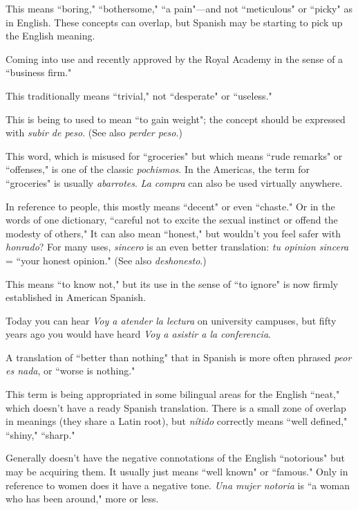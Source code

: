  This means ``boring," ``bothersome," ``a pain"---and not ``meticulous" or ``picky" as in English. These concepts can
overlap, but Spanish may be starting to pick up the English meaning.

 Coming into use and recently approved by the Royal
Academy in the sense of a ``business firm."

 This traditionally means ``trivial," not ``desperate" or
``useless."

 This is being to used to mean ``to gain
weight"; the concept should be expressed with \emph{subir de peso}. (See
also \emph{perder peso}.)

 This word, which is misused for ``groceries" but
which means ``rude remarks" or ``offenses," is one of the classic \emph{pochismos}. In the Americas, the term for ``groceries" is usually \emph{abarrotes}. \emph{La compra} can also be used virtually anywhere.

 In reference to people, this mostly means ``decent"
or even ``chaste." Or in the words of one dictionary, ``careful not to excite the sexual instinct or offend the modesty of others," It can also
mean ``honest," but wouldn't you feel safer with \emph{honrado}? For many
uses, \emph{sincero} is an even better translation: \emph{tu opinion sincera} = ``your
honest opinion." (See also \emph{deshonesto}.)

 This means ``to know not," but its use in the sense
of ``to ignore" is now firmly established in American Spanish.

 Today you can hear \emph{Voy a atender la lectura} on
university campuses, but fifty years ago you would have heard \emph{Voy a
asistir a la conferencia}.

 A translation of ``better than nothing"
that in Spanish is more often phrased \emph{peor es nada}, or ``worse is
nothing."

 This term is being appropriated in some bilingual
areas for the English ``neat," which doesn't have a ready Spanish translation. There is a small zone of overlap in meanings (they share a Latin
root), but \emph{nítido} correctly means ``well defined," ``shiny," ``sharp."

 Generally doesn't have the negative connotations
of the English ``notorious" but may be acquiring them. It usually just
means ``well known" or ``famous." Only in reference to women does it
have a negative tone. \emph{Una mujer notoria} is ``a woman who has been
around," more or less.

